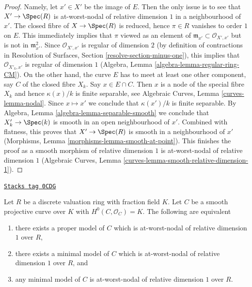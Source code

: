 \begin{proof}
Namely, let $x' \in X'$ be the image of $E$.
Then the only issue is to see that $X' \to \Spec(R)$
is at-worst-nodal of relative dimension $1$
in a neighbourhood of $x'$.
The closed fibre of $X \to \Spec(R)$ is reduced, hence
$\pi \in R$ vanishes to order $1$ on $E$.
This immediately implies that
$\pi$ viewed as an element of
$\mathfrak m_{x'} \subset \mathcal{O}_{X', x'}$ but
is not in $\mathfrak m_{x'}^2$.
Since $\mathcal{O}_{X', x'}$ is regular of
dimension $2$ (by definition of contractions in
Resolution of Surfaces, Section \ref{resolve-section-minus-one}),
this implies that $\mathcal{O}_{X'_k, x'}$
is regular of dimension $1$
(Algebra, Lemma \ref{algebra-lemma-regular-ring-CM}).
On the other hand, the curve $E$ has to meet at
least one other component, say $C$ of the closed fibre $X_k$.
Say $x \in E \cap C$. Then $x$ is a node of the special
fibre $X_k$ and hence $\kappa(x)/k$ is finite separable,
see Algebraic Curves, Lemma \ref{curves-lemma-nodal}.
Since $x \mapsto x'$ we conclude that $\kappa(x')/k$
is finite separable.
By Algebra, Lemma \ref{algebra-lemma-separable-smooth}
we conclude that $X'_k \to \Spec(k)$ is smooth
in an open neighbourhood of $x'$.
Combined with flatness, this proves that
$X' \to \Spec(R)$ is smooth in a neighbourhood of $x'$
(Morphisms, Lemma \ref{morphisms-lemma-smooth-at-point}).
This finishes the proof as a smooth morphism of
relative dimension $1$ is at-worst-nodal of relative
dimension $1$
(Algebraic Curves, Lemma \ref{curves-lemma-smooth-relative-dimension-1}).
\end{proof}

\begin{lemma}[Semistable]
\label{models-lemma-semistable}
\href{https://stacks.math.columbia.edu/tag/0CDG}{\texttt{Stacks tag 0CDG}}

Let $R$ be a discrete valuation ring with fraction field $K$.
Let $C$ be a smooth projective curve over $K$ with $H^0(C, \mathcal{O}_C) = K$.
The following are equivalent
\begin{enumerate}
\item there exists a proper model of $C$ which is
at-worst-nodal of relative dimension $1$ over $R$,
\item there exists a minimal model of $C$ which is at-worst-nodal
of relative dimension $1$ over $R$, and
\item any minimal model of $C$ is at-worst-nodal
of relative dimension $1$ over $R$.
\end{enumerate}
\end{lemma}

